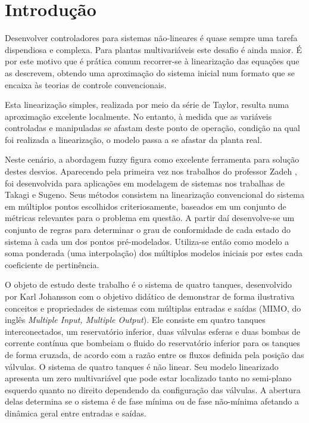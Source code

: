 %

\chapter{Introdução} \label{capIntrod}
Desenvolver controladores para sistemas não-lineares é quase sempre uma tarefa dispendiosa e complexa. Para plantas multivariáveis este desafio é ainda maior. É por este motivo que é prática comum recorrer-se à linearização das equações que as descrevem, obtendo uma aproximação do sistema inicial num formato que se encaixa às teorias de controle convencionais.

Esta linearização simples, realizada por meio da série de Taylor, resulta numa aproximação excelente localmente. No entanto, à medida que as variáveis controladas e manipuladas se afastam deste ponto de operação, condição na qual foi realizada a linearização, o modelo passa a se afastar da planta real.

Neste cenário, a abordagem fuzzy figura como excelente ferramenta para solução destes desvios. Aparecendo pela primeira vez nos trabalhos do professor Zadeh \cite{zadeh}, foi desenvolvida para aplicações em modelagem de sistemas nos trabalhas de Takagi e Sugeno\cite{takagiSugeno}. Seus métodos consistem na linearização convencional do sistema em múltiplos pontos escolhidos criteriosamente, baseados em um conjunto de métricas relevantes para o problema em questão. A partir daí desenvolve-se um conjunto de regras para determinar o grau de conformidade de cada estado do sistema à cada um dos pontos pré-modelados. Utiliza-se então como modelo a soma ponderada (uma interpolação) dos múltiplos modelos iniciais por estes cada coeficiente de pertinência. 

O objeto de estudo deste trabalho é o sistema de quatro tanques, desenvolvido por Karl Johansson \cite{johansson2} com o objetivo didático de demonstrar de forma ilustrativa conceitos e propriedades de sistemas com múltiplas entradas e saídas (MIMO, do inglês \textit{Multiple Input, Multiple Output}). Ele consiste em quatro tanques interconectados, um reservatório inferior, duas válvulas esferas e duas bombas de corrente contínua que bombeiam o fluido do reservatório inferior para os tanques de forma cruzada, de acordo com a razão entre os fluxos definida pela posição das válvulas. O sistema de quatro tanques é não linear. Seu modelo linearizado apresenta um zero multivariável que pode estar localizado tanto no semi-plano esquerdo quanto no  direito dependendo da configuração das válvulas. A abertura delas determina se o sistema é de fase mínima ou de fase não-mínima afetando a dinâmica geral entre entradas e saídas.

